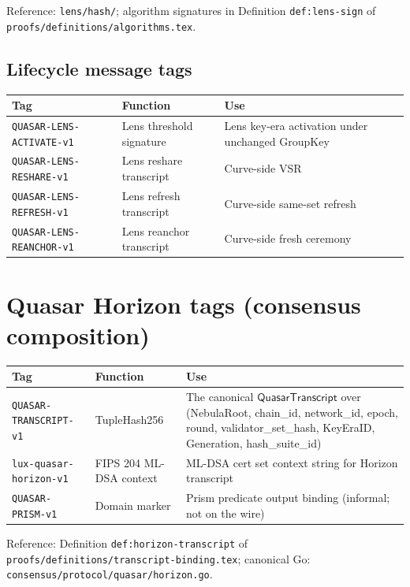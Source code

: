 \documentclass[11pt,a4paper]{article}
\begin{document}
Reference: \texttt{lens/hash/}; algorithm signatures in Definition \texttt{def:lens-sign} of \texttt{proofs/definitions/algorithms.tex}.

\subsection{Lifecycle message tags}

\begin{tabularx}{\textwidth}{@{}p{}p{}X@{}}
  \toprule
  \textbf{Tag} & \textbf{Function} & \textbf{Use} \\
  \midrule
  \texttt{QUASAR-LENS-ACTIVATE-v1} & Lens threshold signature & Lens key-era activation under unchanged GroupKey \\
  \texttt{QUASAR-LENS-RESHARE-v1}  & Lens reshare transcript & Curve-side VSR \\
  \texttt{QUASAR-LENS-REFRESH-v1}  & Lens refresh transcript & Curve-side same-set refresh \\
  \texttt{QUASAR-LENS-REANCHOR-v1} & Lens reanchor transcript & Curve-side fresh ceremony \\
  \bottomrule
\end{tabularx}

\section{Quasar Horizon tags (consensus composition)}

\begin{tabularx}{\textwidth}{@{}p{}p{}X@{}}
  \toprule
  \textbf{Tag} & \textbf{Function} & \textbf{Use} \\
  \midrule
  \texttt{QUASAR-TRANSCRIPT-v1} & TupleHash256 & The canonical $\mathsf{QuasarTranscript}$ over (NebulaRoot, chain\_id, network\_id, epoch, round, validator\_set\_hash, KeyEraID, Generation, hash\_suite\_id) \\
  \texttt{lux-quasar-horizon-v1} & FIPS 204 ML-DSA context & ML-DSA cert set context string for Horizon transcript \\
  \texttt{QUASAR-PRISM-v1} & Domain marker & Prism predicate output binding (informal; not on the wire) \\
  \bottomrule
\end{tabularx}

Reference: Definition \texttt{def:horizon-transcript} of \texttt{proofs/definitions/transcript-binding.tex}; canonical Go: \texttt{consensus/protocol/quasar/horizon.go}.
\end{document}
